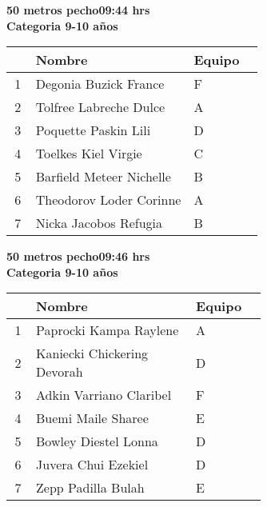 \begin{minipage}{0.95\linewidth}\vspace{0.5cm} 
\begin{flushleft}
\textbf{
\hspace{-0.15cm}50 metros pecho\hspace{1.5cm}09:44 hrs \\Categoria 9-10 años}\vspace{-0.2cm} 
\end{flushleft}
\begin{tabular}{cp{0.63\linewidth}l}
\hline
& \textbf{Nombre} & \textbf{Equipo} \\ \hline
1 & Degonia Buzick France & F \\ 
2 & Tolfree Labreche Dulce & A \\ 
3 & Poquette Paskin Lili & D \\ 
4 & Toelkes Kiel Virgie & C \\ 
5 & Barfield Meteer Nichelle & B \\ 
6 & Theodorov Loder Corinne & A \\ 
7 & Nicka Jacobos Refugia & B \\ 
\end{tabular}
\end{minipage}
\begin{minipage}{0.95\linewidth}\vspace{0.5cm} 
\begin{flushleft}
\textbf{
\hspace{-0.15cm}50 metros pecho\hspace{1.5cm}09:46 hrs \\Categoria 9-10 años}\vspace{-0.2cm} 
\end{flushleft}
\begin{tabular}{cp{0.63\linewidth}l}
\hline
& \textbf{Nombre} & \textbf{Equipo} \\ \hline
1 & Paprocki Kampa Raylene & A \\ 
2 & Kaniecki Chickering Devorah & D \\ 
3 & Adkin Varriano Claribel & F \\ 
4 & Buemi Maile Sharee & E \\ 
5 & Bowley Diestel Lonna & D \\ 
6 & Juvera Chui Ezekiel & D \\ 
7 & Zepp Padilla Bulah & E \\ 
\end{tabular}
\end{minipage}
